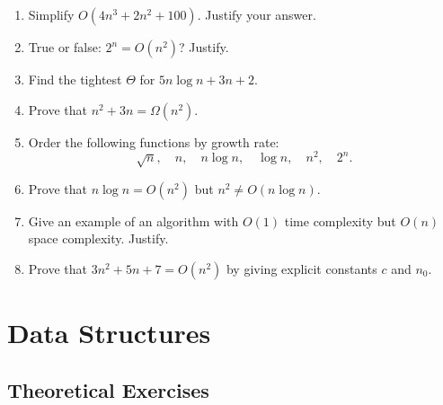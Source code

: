 \documentclass[11pt,a4paper]{article}
\newcommand{\easy}{$\star$}
\newcommand{\medium}{$\star\star$}
\begin{document}
\begin{enumerate}[label=\textbf{1.\arabic*}]

    \item[\easy] Simplify $O(4n^3 + 2n^2 + 100)$. Justify your answer.

    \item[\easy] True or false: $2^n = O(n^2)$? Justify.

    \item[\easy] Find the tightest $\Theta$ for $5n \log n + 3n + 2$.

    \item[\medium] Prove that $n^2 + 3n = \Omega(n^2)$.

    \item[\medium] Order the following functions by growth rate:
    \[
    \sqrt{n}, \quad n, \quad n \log n, \quad \log n, \quad n^2, \quad 2^n.
    \]

    \item[\medium] Prove that $n \log n = O(n^2)$ but $n^2 \neq O(n \log n)$.

    \item[\medium] Give an example of an algorithm with $O(1)$ time complexity but $O(n)$ space complexity. Justify.

    \item[\medium] Prove that $3n^2 + 5n + 7 = O(n^2)$ by giving explicit constants $c$ and $n_0$.

\end{enumerate}

\section{Data Structures}

\subsection{Theoretical Exercises}
\end{document}
